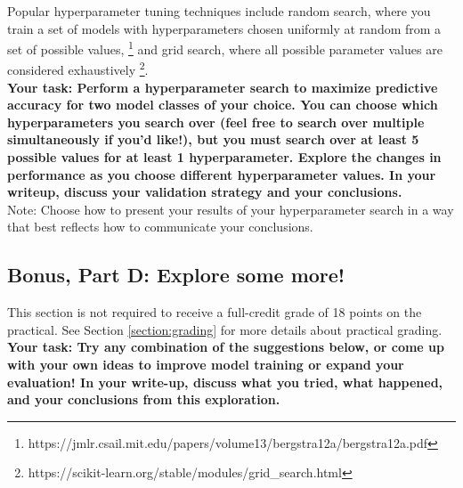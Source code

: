 \documentclass[12pt]{article}
\begin{document}
\noindent Popular hyperparameter tuning techniques include random search, where you train a set of models with hyperparameters chosen uniformly at random from a set of possible values, \footnote{https://jmlr.csail.mit.edu/papers/volume13/bergstra12a/bergstra12a.pdf} and grid search, where all possible parameter values are considered exhaustively \footnote{https://scikit-learn.org/stable/modules/grid\_search.html}.\\

\noindent \textbf{Your task: Perform a hyperparameter search to maximize predictive accuracy for two model classes of your choice.  You can choose which hyperparameters you search over (feel free to search over multiple simultaneously if you'd like!), but you must search over at least 5 possible values for at least 1 hyperparameter.  Explore the changes in performance as you choose different hyperparameter values. In your writeup, discuss your validation strategy and your conclusions.}\\

\noindent Note: Choose how to present your results of your hyperparameter search in a way that best reflects how to communicate your conclusions.

\subsection{Bonus, Part D: Explore some more!}\label{section:task-exploration}

This section is not required to receive a full-credit grade of 18 points on the practical.  See Section \ref{section:grading} for more details about practical grading.
\\

\noindent \textbf{Your task: Try any combination of the suggestions below, or come up with your own ideas to improve model training or expand your evaluation!  In your write-up, discuss what you tried, what happened, and your conclusions from this exploration.}\\
\end{document}
